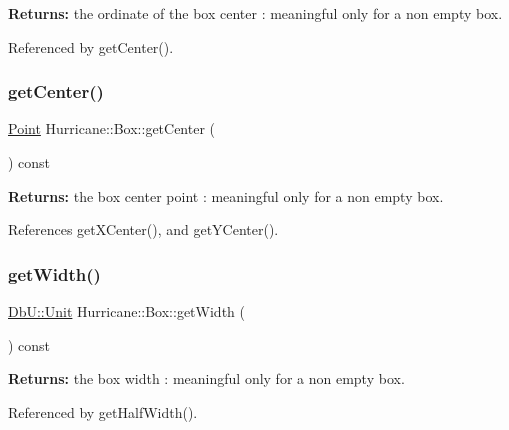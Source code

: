 {\bfseries Returns\+:} the ordinate of the box center \+: meaningful only for a non empty box. 

Referenced by get\+Center().

\mbox{\label{classHurricane_1_1Box_ac18c8725989166d1b101de29531e4f6e}} 
\subsubsection{\texorpdfstring{get\+Center()}{getCenter()}}
{\footnotesize\ttfamily \hyperlink{classHurricane_1_1Point}{Point} Hurricane\+::\+Box\+::get\+Center (\begin{DoxyParamCaption}{ }\end{DoxyParamCaption}) const\hspace{0.3cm}{\ttfamily [inline]}}

{\bfseries Returns\+:} the box center point \+: meaningful only for a non empty box. 

References get\+X\+Center(), and get\+Y\+Center().

\mbox{\label{classHurricane_1_1Box_ae2cc9cf0b17e6443a88b475bbd36e4c9}} 
\subsubsection{\texorpdfstring{get\+Width()}{getWidth()}}
{\footnotesize\ttfamily \hyperlink{group__DbUGroup_ga4fbfa3e8c89347af76c9628ea06c4146}{Db\+U\+::\+Unit} Hurricane\+::\+Box\+::get\+Width (\begin{DoxyParamCaption}{ }\end{DoxyParamCaption}) const\hspace{0.3cm}{\ttfamily [inline]}}

{\bfseries Returns\+:} the box width \+: meaningful only for a non empty box. 

Referenced by get\+Half\+Width().

\mbox{\label{classHurricane_1_1Box_a8aa689ad799e4c78bfefb0328e7d9081}} 
